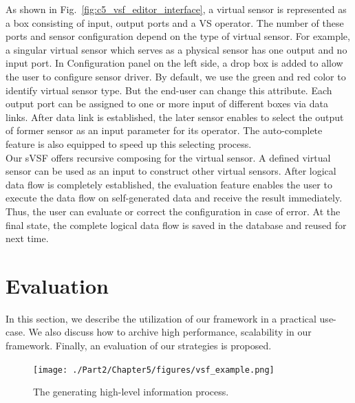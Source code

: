 As shown in Fig.~\ref{fig:c5_vsf_editor_interface}, a virtual sensor is represented as a box consisting of input, output ports and a VS operator. The number of these ports and sensor configuration depend on the type of virtual sensor. For example, a singular virtual sensor which serves as a physical sensor has one output and no input port. In Configuration panel on the left side, a drop box is added to allow the user to configure sensor driver. By default, we use the green and red color to identify virtual sensor type. But the end-user can change this attribute. Each output port can be assigned to one or more input of different boxes via data links. After data link is established, the later sensor enables to select the output of former sensor as an input parameter for its operator. The auto-complete feature is also equipped to speed up this selecting process. \\

Our sVSF offers recursive composing for the virtual sensor. A defined virtual sensor can be used as an input to construct other virtual sensors. After logical data flow is completely established, the evaluation feature enables the user to execute the data flow on self-generated data and receive the result immediately. Thus, the user can evaluate or correct the configuration in case of error. At the final state, the complete logical data flow is saved in the database and reused for next time.


\section{Evaluation}
In this section, we describe the utilization of our framework in a practical use-case. We also discuss how to archive high performance, scalability in our framework. Finally, an evaluation of our strategies is proposed.\\

\begin{figure}[h!] 
 \begin{center} 
 \texttt{[image: ./Part2/Chapter5/figures/vsf\_example.png]} 
    \caption{The generating high-level information process.}
     \label{fig:c5_vsf_example}
  \end{center} 
\end{figure}

